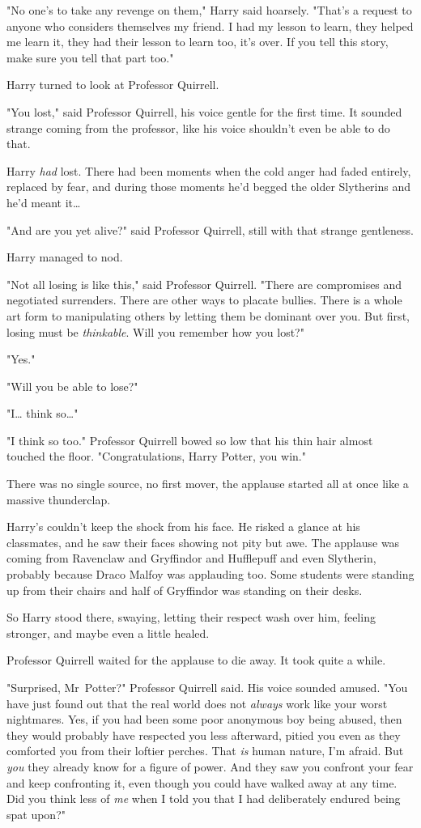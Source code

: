 "No one's to take any revenge on them," Harry said hoarsely. "That's a request
to anyone who considers themselves my friend. I had my lesson to learn, they
helped me learn it, they had their lesson to learn too, it's over. If you tell
this story, make sure you tell that part too."

Harry turned to look at Professor Quirrell.

"You lost," said Professor Quirrell, his voice gentle for the first time. It
sounded strange coming from the professor, like his voice shouldn't even be
able to do that.

Harry \emph{had} lost. There had been moments when the cold anger had faded
entirely, replaced by fear, and during those moments he'd begged the older
Slytherins and he'd meant it{\ldots}

"And are you yet alive?" said Professor Quirrell, still with that strange
gentleness.

Harry managed to nod.

"Not all losing is like this," said Professor Quirrell. "There are compromises
and negotiated surrenders. There are other ways to placate bullies. There is a
whole art form to manipulating others by letting them be dominant over you. But
first, losing must be \emph{thinkable}. Will you remember how you lost?"

"Yes."

"Will you be able to lose?"

"I{\ldots} think so{\ldots}"

"I think so too." Professor Quirrell bowed so low that his thin hair almost
touched the floor. "Congratulations, Harry Potter, you win."

There was no single source, no first mover, the applause started all at once
like a massive thunderclap.

Harry's couldn't keep the shock from his face. He risked a glance at his
classmates, and he saw their faces showing not pity but awe. The applause was
coming from Ravenclaw and Gryffindor and Hufflepuff and even Slytherin,
probably because Draco Malfoy was applauding too. Some students were standing
up from their chairs and half of Gryffindor was standing on their desks.

So Harry stood there, swaying, letting their respect wash over him, feeling
stronger, and maybe even a little healed.

Professor Quirrell waited for the applause to die away. It took quite a while.

"Surprised, Mr~Potter?" Professor Quirrell said. His voice sounded amused.
"You have just found out that the real world does not \emph{always} work like
your worst nightmares. Yes, if you had been some poor anonymous boy being
abused, then they would probably have respected you less afterward, pitied you
even as they comforted you from their loftier perches. That \emph{is} human
nature, I'm afraid. But \emph{you} they already know for a figure of power. And
they saw you confront your fear and keep confronting it, even though you could
have walked away at any time. Did you think less of \emph{me} when I told you
that I had deliberately endured being spat upon?"

